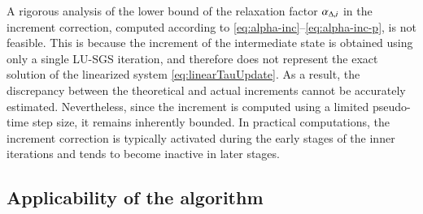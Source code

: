 A rigorous analysis of the lower bound of the relaxation factor $\alpha_{\mathrm\Delta,i}$ in the increment correction, computed according to \eqref{eq:alpha-inc}–\eqref{eq:alpha-inc-p}, is not feasible. This is because the increment of the intermediate state is obtained using only a single LU-SGS iteration, and therefore does not represent the exact solution of the linearized system \eqref{eq:linearTauUpdate}. As a result, the discrepancy between the theoretical and actual increments cannot be accurately estimated. Nevertheless, since the increment is computed using a limited pseudo-time step size, it remains inherently bounded. In practical computations, the increment correction is typically activated during the early stages of the inner iterations and tends to become inactive in later stages.

\subsection{Applicability of the algorithm}


